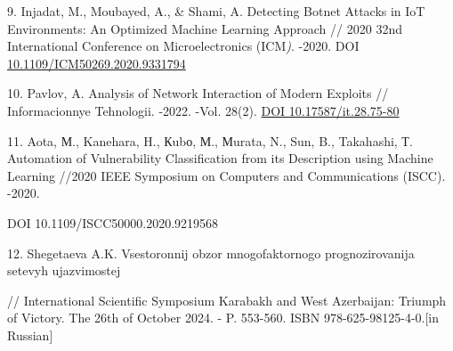 \begin{references}
9. Injadat, M., Moubayed, A., \& Shami, A. Detecting Botnet Attacks in
IoT Environments: An Optimized Machine Learning Approach // 2020 32nd
International Conference on Microelectronics (ICM\emph{)}. -2020. DOI
\href{https://doi.org/10.1109/ICM50269.2020.9331794}{10.1109/ICM50269.2020.9331794}

10. Pavlov, A. Analysis of Network Interaction of Modern Exploits //
Informacionnye Tehnologii. -2022. -Vol. 28(2).
\href{https://doi.org/10.17587/it.28.75-80}{DOI 10.17587/it.28.75-80}

11. Aota, М., Kanehara, H., Кubо, М., Мurata, N., Sun, B., Takahashi, Т.
Automation of Vulnerability Classification from its Description using
Machine Learning //2020 IEEE Symposium on Computers and Communications
(ISCC). -2020.

DOI 10.1109/ISCC50000.2020.9219568

12. Shegetaeva A.K. Vsestoronnij obzor mnogofaktornogo prognozirovanija
setevyh ujazvimostej

// International Scientific Symposium Karabakh and West Azerbaijan:
Triumph of Victory. The 26th of October 2024. - P. 553-560. ISBN
978-625-98125-4-0.{[}in Russian{]}
\end{references}

